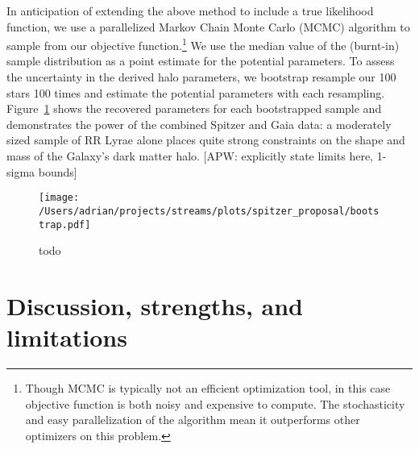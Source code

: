 \documentclass[preprint]{aastex}
\begin{document}
In anticipation of extending the above method to include a true
likelihood function, we use a parallelized Markov Chain Monte Carlo
(MCMC) algorithm \citep{foremanmackey2013} to sample from our
objective function.\footnote{Though MCMC is typically not an efficient
  optimization tool, in this case objective function is both noisy and
  expensive to compute. The stochasticity and easy parallelization of
  the algorithm mean it outperforms other optimizers on this problem.}
We use the median value of the (burnt-in) sample distribution as a
point estimate for the potential parameters. To assess the uncertainty
in the derived halo parameters, we bootstrap resample our 100 stars
100 times and estimate the potential parameters with each
resampling. Figure~\ref{fig:bootstrap} shows the recovered parameters
for each bootstrapped sample and demonstrates the power of the
combined Spitzer and Gaia data: a moderately sized sample of RR Lyrae
alone places quite strong constraints on the shape and mass of the
Galaxy's dark matter halo. [APW: explicitly state limits here, 1-sigma bounds]

\begin{figure}[h]
\begin{center}
\texttt{[image: /Users/adrian/projects/streams/plots/spitzer\_proposal/bootstrap.pdf]}
\caption{ todo }\label{fig:bootstrap}
\end{center}
\end{figure}


\section{Discussion, strengths, and limitations}
\label{sec:discussion}
\end{document}
